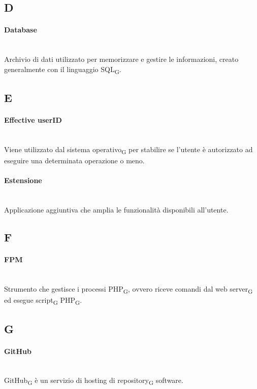 \newpage
{}
\subsection*{D}
\paragraph{Database}~\smallskip \\
Archivio di dati utilizzato per memorizzare e gestire le informazioni, creato generalmente con il linguaggio SQL\textsubscript{G}.

\newpage
{}
\subsection*{E}
\paragraph{Effective userID}~\smallskip \\
Viene utilizzato dal sistema operativo\textsubscript{G} per stabilire se l'utente è autorizzato ad eseguire una determinata operazione o meno.

\paragraph{Estensione}~\smallskip \\
Applicazione aggiuntiva che amplia le funzionalità disponibili all'utente.

\newpage
{}
\subsection*{F}
\paragraph{FPM}~\smallskip \\
Strumento che gestisce i processi PHP\textsubscript{G}, ovvero riceve comandi dal web server\textsubscript{G} ed esegue script\textsubscript{G} PHP\textsubscript{G}. 

\newpage
{}
\subsection*{G}
\paragraph{GitHub}~\smallskip \\
GitHub\textsubscript{G} è un servizio di hosting di repository\textsubscript{G} software.

